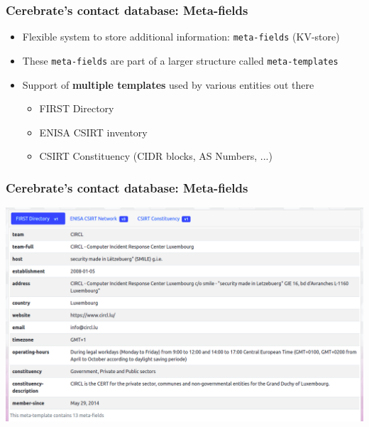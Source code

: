 \begin{frame}
\frametitle{Cerebrate's contact database: Meta-fields}
    \begin{itemize}
        \item Flexible system to store additional information: \texttt{meta-fields} (KV-store)
        \item These \texttt{meta-fields} are part of a larger structure called \texttt{meta-templates}
        \item Support of {\bf multiple templates} used by various entities out there
        \begin{itemize}
            \item FIRST Directory
            \item ENISA CSIRT inventory
            \item CSIRT Constituency (CIDR blocks, AS Numbers, ...)
        \end{itemize}
    \end{itemize}
\end{frame}

\begin{frame}
\frametitle{Cerebrate's contact database: Meta-fields}
\begin{center}
    \includegraphics[width=0.99\linewidth]{pictures/meta-fields-first.png}
\end{center}
\end{frame}


